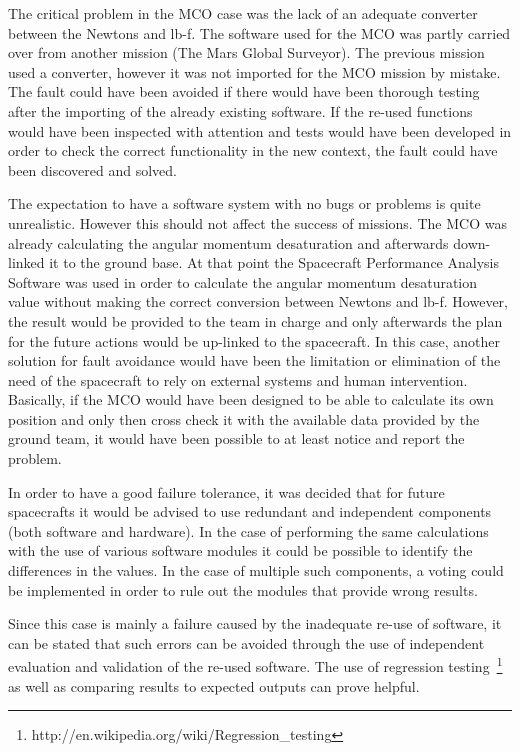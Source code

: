 The critical problem in the MCO case was the lack of an adequate converter
between the Newtons and lb-f. The software used for the MCO was partly carried
over from another mission (The Mars Global Surveyor). The previous mission used
a converter, however it was not imported for the MCO mission by mistake. The
fault could have been avoided if there would have been thorough testing after
the importing of the already existing software. If the re-used functions would
have been inspected with attention and tests would have been developed in order
to check the correct functionality in the new context, the fault could have been
discovered and solved.

The expectation to have a software system with no bugs or problems is quite
unrealistic. However this should not affect the success of missions. The MCO was
already calculating the angular momentum desaturation and afterwards
down-linked it to the ground base. At that point the Spacecraft Performance
Analysis Software was used in order to calculate the angular momentum
desaturation value without making the correct conversion between Newtons and
lb-f. However, the result would be provided to the team in charge and only
afterwards the plan for the future actions would be up-linked to the spacecraft.
In this case, another solution for fault avoidance would have been the
limitation or elimination of the need of the spacecraft to rely on external
systems and human intervention. Basically, if the MCO would have been designed
to be able to calculate its own position and only then cross check it with the
available data provided by the ground team, it would have been possible to at
least notice and report the problem.

In order to have a good failure tolerance, it was decided that for future
spacecrafts it would be advised to use redundant and independent components
(both software and hardware). In the case of performing the same calculations
with the use of various software modules it could be possible to identify the
differences in the values. In the case of multiple such components, a voting
could be implemented in order to rule out the modules that provide wrong
results.

Since this case is mainly a failure caused by the inadequate re-use of software,
it can be stated that such errors can be avoided through the use of independent
evaluation and validation of the re-used software. The use of regression
testing~\footnote{http://en.wikipedia.org/wiki/Regression\_testing} as well
as comparing results to expected outputs can prove helpful.

